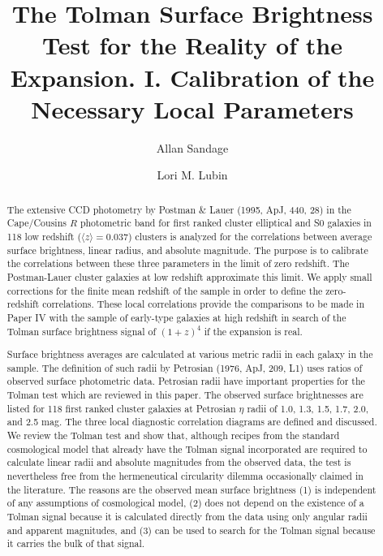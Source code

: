 \documentclass[preprint]{aastex}
\begin{document}
\title{The Tolman Surface Brightness Test for the Reality of the
Expansion. I. Calibration of the Necessary Local Parameters}

\author{Allan Sandage} 
 
\author{Lori M. Lubin} 

 

\begin{abstract}

The extensive CCD photometry by Postman \& Lauer (1995, ApJ, 440, 28)
in the Cape/Cousins $R$ photometric band for first ranked cluster
elliptical and S0 galaxies in 118 low redshift ($\langle z \rangle =
0.037$) clusters is analyzed for the correlations between average
surface brightness, linear radius, and absolute magnitude. The purpose
is to calibrate the correlations between these three parameters in the
limit of zero redshift. The Postman-Lauer cluster galaxies at low
redshift approximate this limit. We apply small corrections for the
finite mean redshift of the sample in order to define the
zero-redshift correlations.  These local correlations provide the
comparisons to be made in Paper IV with the sample of early-type
galaxies at high redshift in search of the Tolman surface brightness
signal of $(1 + z)^4$ if the expansion is real.

Surface brightness averages are calculated at various metric radii in
each galaxy in the sample. The definition of such radii by Petrosian
(1976, ApJ, 209, L1) uses ratios of observed surface photometric data.
Petrosian radii have important properties for the Tolman test which
are reviewed in this paper. The observed surface brightnesses are
listed for 118 first ranked cluster galaxies at Petrosian $\eta$ radii
of 1.0, 1.3, 1.5, 1.7, 2.0, and 2.5 mag.  The three local diagnostic
correlation diagrams are defined and discussed. We review the Tolman
test and show that, although recipes from the standard cosmological
model that already have the Tolman signal incorporated are required to
calculate linear radii and absolute magnitudes from the observed data,
the test is nevertheless free from the hermeneutical circularity
dilemma occasionally claimed in the literature. The reasons are the
observed mean surface brightness (1) is independent of any assumptions
of cosmological model, (2) does not depend on the existence of a
Tolman signal because it is calculated directly from the data using
only angular radii and apparent magnitudes, and (3) can be used to
search for the Tolman signal because it carries the bulk of that
signal.

\end{abstract}
\end{document}
